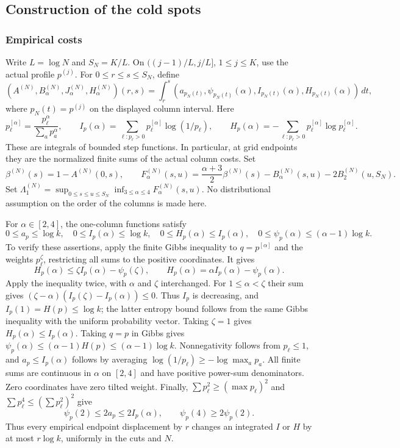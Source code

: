 \documentclass[11pt]{article}
\numberwithin{equation}{section}
\theoremstyle{definition}
\theoremstyle{remark}
\newcommand{\1}{\mathbf 1}
\begin{document}
\subsection{Construction of the cold spots}
\subsubsection{Empirical costs}

Write $L=\log N$ and $S_N=K/L$.  On
$((j-1)/L,j/L]$, $1\le j\le K$, use the actual profile $p^{(j)}$.
For $0\le r\le s\le S_N$, define
\[
 (A^{(N)},B_\alpha^{(N)},J_\alpha^{(N)},H_\alpha^{(N)})(r,s)
 =\int_r^s(a_{p_N(t)},\psi_{p_N(t)}(\alpha),
                 I_{p_N(t)}(\alpha),H_{p_N(t)}(\alpha))\,dt,
\]
where $p_N(t)=p^{(j)}$ on the displayed column interval.
Here
\[
 p^{[\alpha]}_\ell=\frac{p_\ell^\alpha}{\sum_a p_a^\alpha},\qquad
 I_p(\alpha)=\sum_{\ell:p_\ell>0}p^{[\alpha]}_\ell\log(1/p_\ell),\qquad
 H_p(\alpha)=-\sum_{\ell:p_\ell>0}p^{[\alpha]}_\ell\log p^{[\alpha]}_\ell.
\]
These are integrals of bounded step functions.  In particular, at grid
endpoints they are the normalized finite sums of the actual column costs.
Set
\[
 \beta^{(N)}(s)=1-A^{(N)}(0,s),\qquad
 F_\alpha^{(N)}(s,u)=\frac{\alpha+3}{2}\beta^{(N)}(s)
                 -B_\alpha^{(N)}(s,u)-2B_2^{(N)}(u,S_N).
\]
Set $\Lambda_1^{(N)}=\sup_{0\le s\le u\le S_N}
\inf_{3\le\alpha\le4}F_\alpha^{(N)}(s,u)$.
No distributional assumption on the order of the columns is made here.

For $\alpha\in[2,4]$, the one-column functions satisfy
\begin{equation}\label{eq:repair-global-one-column-bounds}
 0\le a_p\le\log k,\quad
 0\le I_p(\alpha)\le\log k,\quad
 0\le H_p(\alpha)\le I_p(\alpha),\quad
 0\le\psi_p(\alpha)\le(\alpha-1)\log k.
\end{equation}
To verify these assertions, apply the finite Gibbs inequality to
$q=p^{[\alpha]}$ and the weights $p_\ell^\zeta$, restricting all sums to
the positive coordinates. It gives
\[
 H_p(\alpha)\le\zeta I_p(\alpha)-\psi_p(\zeta),\qquad
 H_p(\alpha)=\alpha I_p(\alpha)-\psi_p(\alpha).
\]
Apply the inequality twice, with $\alpha$ and $\zeta$ interchanged. For
$1\le\alpha<\zeta$ their sum gives
$(\zeta-\alpha)(I_p(\zeta)-I_p(\alpha))\le0$.
Thus $I_p$ is decreasing, and $I_p(1)=H(p)\le\log k$; the latter
entropy bound follows from the same Gibbs inequality with the uniform
probability vector. Taking $\zeta=1$ gives $H_p(\alpha)\le I_p(\alpha)$.
Taking $q=p$ in Gibbs gives
$\psi_p(\alpha)\le(\alpha-1)H(p)\le(\alpha-1)\log k$.
Nonnegativity follows from $p_\ell\le1$, and $a_p\le I_p(\alpha)$
follows by averaging $\log(1/p_\ell)\ge-\log\max_a p_a$.
All finite sums are continuous in $\alpha$ on $[2,4]$ and have positive
power-sum denominators. Zero coordinates have zero tilted weight.
Finally, $\sum p_\ell^2\ge(\max p_\ell)^2$ and
$\sum p_\ell^4\le(\sum p_\ell^2)^2$ give
\begin{equation}\label{eq:repair-two-comparisons}
 \psi_p(2)\le2a_p\le2I_p(\alpha),\qquad
 \psi_p(4)\ge2\psi_p(2).
\end{equation}Thus every empirical endpoint displacement by $r$ changes an integrated
$I$ or $H$ by at most $r\log k$, uniformly in the cuts and $N$.
\end{document}
